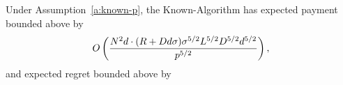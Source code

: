 \begin{theorem}
\label{rst:known-p}
Under Assumption~\ref{a:known-p}, the Known-\MinProb Algorithm has expected payment  bounded above by 
\begin{align*}
O \left(\frac{N^2 d \cdot (R + D d \sigma)\sigma^{5/2}L^{5/2}D^{5/2}d^{5/2}}{p^{5/2}} \right),
\end{align*}
and expected regret bounded above by
\end{theorem}

